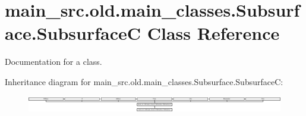 \hypertarget{classmain__src_8old_1_1main__classes_1_1Subsurface_1_1SubsurfaceC}{\section{main\-\_\-src.\-old.\-main\-\_\-classes.\-Subsurface.\-Subsurface\-C Class Reference}
\label{classmain__src_8old_1_1main__classes_1_1Subsurface_1_1SubsurfaceC}
}


Documentation for a class.  


Inheritance diagram for main\-\_\-src.\-old.\-main\-\_\-classes.\-Subsurface.\-Subsurface\-C\-:\begin{figure}[H]
\begin{center}
\leavevmode
\includegraphics[height=0.754717cm]{classmain__src_8old_1_1main__classes_1_1Subsurface_1_1SubsurfaceC}
\end{center}
\end{figure}
